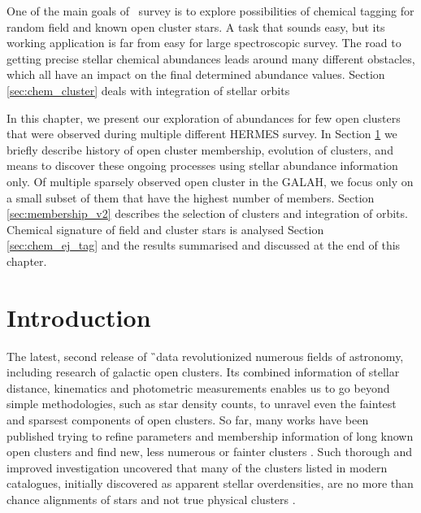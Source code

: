 One of the main goals of \Gh\ survey is to explore possibilities of chemical tagging for random field and known open cluster stars. A task that sounds easy, but its working application is far from easy for large spectroscopic survey. The road to getting precise stellar chemical abundances leads around many different obstacles, which all have an impact on the final determined abundance values. Section \ref{sec:chem_cluster} deals with integration of stellar orbits 

In this chapter, we present our exploration of abundances for few open clusters that were observed during multiple different HERMES survey. In Section \ref{sec:intro_tag} we briefly describe history of open cluster membership, evolution of clusters, and means to discover these ongoing processes using stellar abundance information only. Of multiple sparsely observed open cluster in the GALAH, we focus only on a small subset of them that have the highest number of members. Section \ref{sec:membership_v2} describes the selection of clusters and integration of orbits. Chemical signature of field and cluster stars is analysed Section \ref{sec:chem_ej_tag} and the results summarised and discussed at the end of this chapter.

\section{Introduction}
\label{sec:intro_tag}
The latest, second release of \G\ data \citep[DR2,][]{2018arXiv180409365G} revolutionized numerous fields of astronomy, including research of galactic open clusters. Its combined information of stellar distance, kinematics and photometric measurements enables us to go beyond simple methodologies, such as star density counts, to unravel even the faintest and sparsest components of open clusters. So far, many works have been published trying to refine parameters and membership information of long known open clusters \citep{2017A&A...601A..19G, 2018A&A...618A..93C, 2019A&A...627A..35C} and find new, less numerous or fainter clusters \citep{2019ApJS..245...32L, 2019JKAS...52..145S, 2019A&A...624A.126C, 2020arXiv200107122C}. Such thorough and improved investigation uncovered that many of the clusters listed in modern catalogues, initially discovered as apparent stellar overdensities, are no more than chance alignments of stars and not true physical clusters \citep{1998A&A...340..402B, 2000A&A...357..145C, 2016AJ....152....7H, 2018MNRAS.480.5242K, 2020A&A...633A..99C}.

